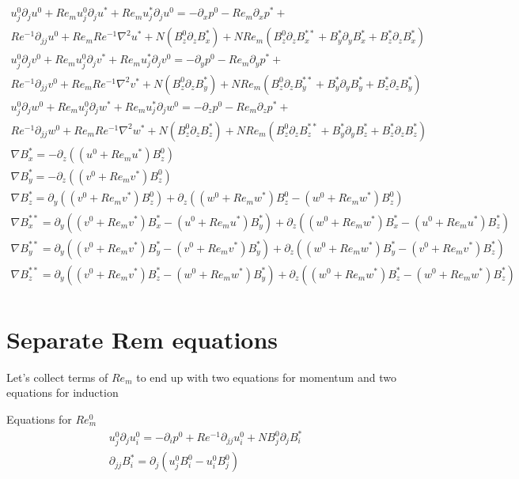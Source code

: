 \documentclass[11pt]{article}
\newcommand{\PD}{\partial}
\begin{document}
\begin{equation}\begin{aligned}
u_j^0 \PD_j u^0 + Re_m u_j^0 \PD_j u^* + Re_m u_j^* \PD_j u^0 = -\PD_x p^0 - Re_m\PD_x p^*+ \\ Re^{-1} \PD_{jj} u^0 + Re_m Re^{-1} \nabla^2 u^* + N (B_z^0 \PD_z B_x^*) + N Re_m ( B_z^0 \PD_z B_x^{**} + B_y^* \PD_y B_x^* + B_z^* \PD_z B_x^* ) \\
u_j^0 \PD_j v^0 + Re_m u_j^0 \PD_j v^* + Re_m u_j^* \PD_j v^0 = -\PD_y p^0 - Re_m\PD_y p^*+ \\ Re^{-1} \PD_{jj} v^0 + Re_m Re^{-1} \nabla^2 v^* + N (B_z^0 \PD_z B_y^*) + N Re_m ( B_z^0 \PD_z B_y^{**} + B_y^* \PD_y B_y^* + B_z^* \PD_z B_y^* ) \\
u_j^0 \PD_j w^0 + Re_m u_j^0 \PD_j w^* + Re_m u_j^* \PD_j w^0 = -\PD_z p^0 - Re_m\PD_z p^*+ \\ Re^{-1} \PD_{jj} w^0 + Re_m Re^{-1} \nabla^2 w^* + N (B_z^0 \PD_z B_z^*) + N Re_m ( B_z^0 \PD_z B_z^{**} + B_y^* \PD_y B_z^* + B_z^* \PD_z B_z^* ) \\
\nabla B_x^{*}  =-\PD_z ((u^0+Re_m u^*) B_z^{0}) \\
\nabla B_y^{*}  =-\PD_z ((v^0+Re_m v^*) B_z^{0}) \\
\nabla B_z^{*}  = \PD_y ((v^0+Re_m v^*) B_z^{0}) + \PD_z ((w^0+Re_m w^*) B_z^{0} - (w^0+Re_m w^*) B_z^{0}) \\
\nabla B_x^{**} = \PD_y ((v^0+Re_m v^*) B_x^{*} - (u^0+Re_m u^*) B_y^{*}) + \PD_z ((w^0+Re_m w^*) B_x^{*} - (u^0+Re_m u^*) B_z^{*}) \\
\nabla B_y^{**} = \PD_y ((v^0+Re_m v^*) B_y^{*} - (v^0+Re_m v^*) B_y^{*}) + \PD_z ((w^0+Re_m w^*) B_y^{*} - (v^0+Re_m v^*) B_z^{*}) \\
\nabla B_z^{**} = \PD_y ((v^0+Re_m v^*) B_z^{*} - (w^0+Re_m w^*) B_y^{*}) + \PD_z ((w^0+Re_m w^*) B_z^{*} - (w^0+Re_m w^*) B_z^{*}) \\
\end{aligned}\end{equation}

\section{Separate Rem equations}

Let's collect terms of $Re_m$ to end up with two equations for momentum and two equations for induction

Equations for $Re_m^0$
\begin{equation}\boxed{\begin{aligned}
u_j^0 \PD_j u_i^0 = -\PD_i p^0 + Re^{-1} \PD_{jj} u_i^0 + N B_j^0 \PD_j B_i^* \\
\PD_{jj} B_i^* = \PD_j ( u_j^0 B_i^0 - u_i^0 B_j^0)
\end{aligned}}\end{equation}
\end{document}
